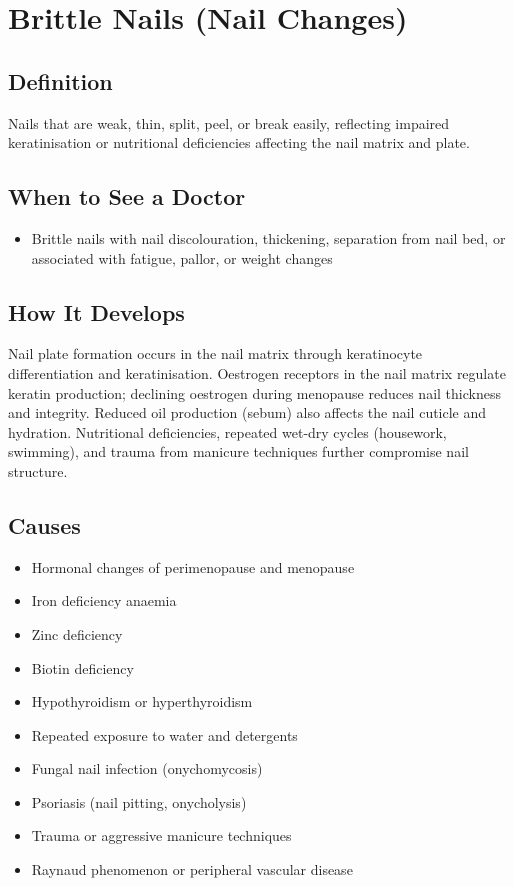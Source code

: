 \chapter{Brittle Nails (Nail Changes)}

\section*{Definition}
Nails that are weak, thin, split, peel, or break easily, reflecting impaired keratinisation or nutritional deficiencies affecting the nail matrix and plate.

\section*{When to See a Doctor}

\begin{itemize}
 \item Brittle nails with nail discolouration, thickening, separation from nail bed, or associated with fatigue, pallor, or weight changes
\end{itemize}

\section*{How It Develops}
Nail plate formation occurs in the nail matrix through keratinocyte differentiation and keratinisation. Oestrogen receptors in the nail matrix regulate keratin production; declining oestrogen during menopause reduces nail thickness and integrity. Reduced oil production (sebum) also affects the nail cuticle and hydration. Nutritional deficiencies, repeated wet-dry cycles (housework, swimming), and trauma from manicure techniques further compromise nail structure.

\section*{Causes}
\begin{itemize}
 \item Hormonal changes of perimenopause and menopause
 \item Iron deficiency anaemia
 \item Zinc deficiency
 \item Biotin deficiency
 \item Hypothyroidism or hyperthyroidism
 \item Repeated exposure to water and detergents
 \item Fungal nail infection (onychomycosis)
 \item Psoriasis (nail pitting, onycholysis)
 \item Trauma or aggressive manicure techniques
 \item Raynaud phenomenon or peripheral vascular disease
\end{itemize}

